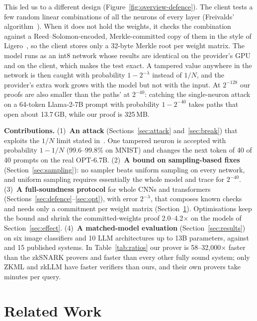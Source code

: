 \documentclass[sigconf,nonacm]{acmart}
\newcommand{\para}[1]{\par\noindent\textbf{#1}\quad}
\begin{document}
This led us to a different design (Figure~\ref{fig:overview-defence}). The client tests a few random linear combinations of all the neurons of every layer (Freivalds'
algorithm~\cite{freivalds1977}). When it does not hold the weights, it checks the combination
against a Reed--Solomon-encoded, Merkle-committed copy of them in the style of
Ligero~\cite{ligero}, so the client stores only a 32-byte Merkle root per weight matrix. The model
runs as an int8 network whose results are identical on the provider's GPU and on the client,
which makes the test exact. A tampered value anywhere in the network is then caught with
probability $1-2^{-\lambda}$ instead of $1/N$, and the provider's extra work grows with the model
but not with the input. At $2^{-128}$ our proofs are also smaller than the paths' at $2^{-40}$:
catching the single-neuron attack on a 64-token Llama-2-7B prompt with probability $1-2^{-40}$
takes paths that open about 13.7\,GB, while our proof is 325\,MB.

\para{Contributions.} (1)~\textbf{An attack} (Sections~\ref{sec:attack} and~\ref{sec:break})
that exploits the $1/N$ limit stated in~\cite{anchuri2026verifiable}. One tampered neuron is
accepted with probability $1-1/N$ (99.6--99.8\% on MNIST) and changes the next token of 40 of 40
prompts on the real OPT-6.7B. (2)~\textbf{A bound on sampling-based fixes}
(Section~\ref{sec:sampling}): no sampler beats uniform sampling on every network, and uniform
sampling requires essentially the whole model and trace for $2^{-40}$. (3)~\textbf{A full-soundness
protocol} for whole CNNs and transformers (Sections~\ref{sec:defence}--\ref{sec:opt}), with error
$2^{-\lambda}$, that composes known checks and needs only a commitment per weight matrix
(Section~\ref{sec:related}). Optimisations keep the bound and shrink the committed-weights proof 2.0--4.2$\times$ on the models of Section~\ref{sec:effect}.
(4)~\textbf{A matched-model evaluation} (Section~\ref{sec:results}) on six image classifiers and
10 LLM architectures up to 13B parameters, against~\cite{anchuri2026verifiable} and 15 published systems. In Table~\ref{tab:ratios} our prover is 58--32{,}000$\times$ faster than the zkSNARK provers and faster than every other fully sound system; only ZKML and zkLLM have faster verifiers than ours, and their own provers take minutes per query.

\section{Related Work}
\label{sec:related}
\end{document}
